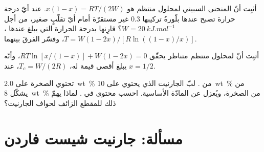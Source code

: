 \begin{exercise}[$\star\star\star$]\label{exo:b3:petrological-thermodynamics:10}
أثبِت أنّ المنحنى السبيني لمحلول منتظم هو $x(1 - x) = RT/(2W)$. عند أيّ
درجة حرارة تصبح عندها بلّورةُ تركيبها 0.3 غير مستقرّة أمام أيّ
تقلّبٍ صغير، من أجل $W = \qty{20}{kJ.mol^{-1}}$؟ قارِنها بدرجة الحرارة التي
يبلغ عندها ، $T = W(1 - 2x)/[R\ln((1 - x)/x)]$، وفسّر
الفرقَ بينهما.
\end{exercise}

\begin{exercise}[$\star\star\star$]\label{exo:b3:petrological-thermodynamics:11}
أثبِت أنّ  لمحلول منتظم متناظر يحقّق $RT\ln[x/(1 -
x)] + W(1 - 2x) = 0$، وأنّه يبلغ أقصى قيمة له، $T_c = W/(2R)$، عند $x
= 1/2$.
\end{exercise}

\begin{exercise}[$\star\star\star$]\label{exo:b3:petrological-thermodynamics:12}
تحتوي الصخرة على \qty{2.0}{wt\percent} من . لبّ الجارنيت الذي يحتوي على
\qty{10}{wt\percent} من  يشكّل \qty{8}{wt\percent} من الصخرة، ويُعزل عن المادّة الأساسية.
احسب محتوى  في . لماذا يهمّ ذلك للمقطع الزائف لحواف الجارنيت؟
\end{exercise}

\section{مسألة: جارنيت شيست فاردن}

